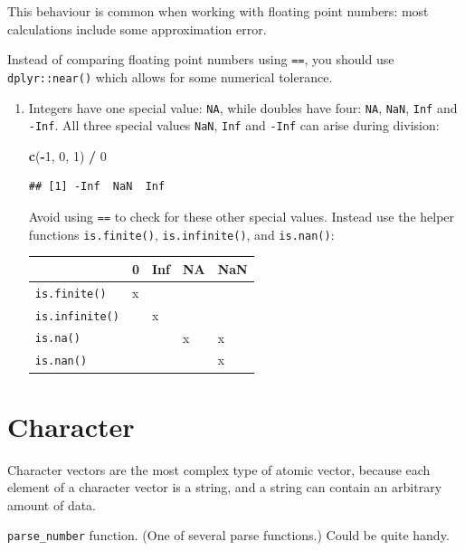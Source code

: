 \documentclass[
]{book}
\newenvironment{Shaded}{\begin{snugshade}}{\end{snugshade}}
\newcommand{\DecValTok}[1]{\textcolor[rgb]{0.00,0.00,0.81}{#1}}
\newcommand{\KeywordTok}[1]{\textcolor[rgb]{0.13,0.29,0.53}{\textbf{#1}}}
\newcommand{\NormalTok}[1]{#1}
\newcommand{\OperatorTok}[1]{\textcolor[rgb]{0.81,0.36,0.00}{\textbf{#1}}}
\newcommand{\StringTok}[1]{\textcolor[rgb]{0.31,0.60,0.02}{#1}}
\begin{document}
This behaviour is common when working with floating point numbers: most calculations include some approximation error.

Instead of comparing floating point numbers using \texttt{==}, you should use \texttt{dplyr::near()} which allows for some numerical tolerance.

\begin{enumerate}
\def\labelenumi{\arabic{enumi}.}
\setcounter{enumi}{1}
\item
  Integers have one special value: \texttt{NA}, while doubles have four: \texttt{NA}, \texttt{NaN}, \texttt{Inf} and \texttt{-Inf}.
  All three special values \texttt{NaN}, \texttt{Inf} and \texttt{-Inf} can arise during division:

\begin{Shaded}
\begin{Highlighting}[]
\KeywordTok{c}\NormalTok{(}\OperatorTok{-}\DecValTok{1}\NormalTok{, }\DecValTok{0}\NormalTok{, }\DecValTok{1}\NormalTok{) }\OperatorTok{/}\StringTok{ }\DecValTok{0}
\end{Highlighting}
\end{Shaded}

\begin{verbatim}
## [1] -Inf  NaN  Inf
\end{verbatim}

  Avoid using \texttt{==} to check for these other special values.
  Instead use the helper functions \texttt{is.finite()}, \texttt{is.infinite()}, and \texttt{is.nan()}:

  \begin{longtable}[]{@{}lllll@{}}
  \toprule
  & 0 & Inf & NA & NaN\tabularnewline
  \midrule
  \endhead
  \texttt{is.finite()} & x & & &\tabularnewline
  \texttt{is.infinite()} & & x & &\tabularnewline
  \texttt{is.na()} & & & x & x\tabularnewline
  \texttt{is.nan()} & & & & x\tabularnewline
  \bottomrule
  \end{longtable}
\end{enumerate}

\hypertarget{character}{%
\section{Character}\label{character}}

Character vectors are the most complex type of atomic vector, because each element of a character vector is a string, and a string can contain an arbitrary amount of data.

\texttt{parse\_number} function. (One of several parse functions.) Could be quite handy.
\end{document}

